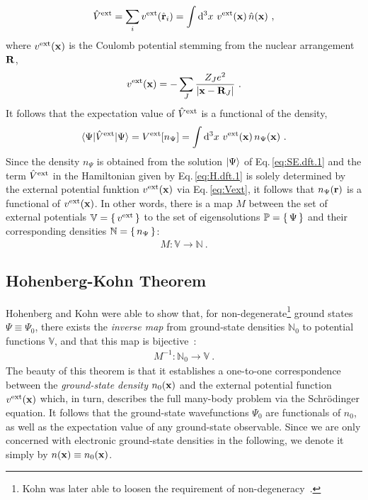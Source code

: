 \begin{align}
	\hat V^{\rm ext}
		= \sum_i v^{\rm ext} (\hat{\bf r}_i)
		= \int \d^3 x ~ v^{\rm ext} ({\bf x}) \, \hat n ({\bf x})~,
		\label{eq:Vext}
\end{align}
where $v^{\rm ext} ({\bf x})$ is the Coulomb potential stemming from the nuclear arrangement $\bf R$,
\begin{align}
	v^{\rm ext} ({\bf x})
		= -\sum_{J} \frac{Z_J e^{2}}{\left|\b x - {\bf R}_{J}\right|}~.
	\label{eq:dft.v^ext}
\end{align}
It follows that the expectation value of $\hat V^{\rm ext}$ is a functional of the density,
\begin{align}
	\braket{\Psi | \hat V^{\rm ext} | \Psi}
		= V^{\rm ext} [n_\Psi]
		= \int \d^3 x ~ v^{\rm ext} ({\bf x}) \, n_\Psi ({\bf x})~.
		\label{eq:dft.Vext.expectation}
\end{align}
Since the density $n_\Psi$ is obtained from the solution $\Ket{\Psi}$ of Eq.\,\eqref{eq:SE.dft.1} and the term $\hat V^{\rm ext}$ in the Hamiltonian given by Eq.\,\eqref{eq:H.dft.1} is solely determined by the external potential funktion $v^{\rm ext} ({\bf x})$ via Eq.\,\eqref{eq:Vext}, it follows that $n_\Psi ({\bf r})$ is a functional of $v^{\rm ext} ({\bf x})$. In other words, there is a map $M$ between the set of external potentials $\mathbb V = \set{v^{\rm ext}}$ to the set of eigensolutions $\mathbb P = \set{\Psi}$ and their corresponding densities $\mathbb N = \set{n_\Psi}$:
\begin{align}
	M: \mathbb V \rightarrow \mathbb N~.
	\label{eq:dft.map.1}
\end{align}

\subsection{Hohenberg-Kohn Theorem}
Hohenberg and Kohn were able to show that, for non-degenerate\footnote{Kohn was later able to loosen the requirement of non-degeneracy~\cite{Kohn1985}.} ground states $\Psi \equiv \Psi_0$, there exists the \emph{inverse map} from ground-state densities $\mathbb N_0$ to potential functions $\mathbb V$, and that this map is bijective~\cite{Hohenberg1964}:
\begin{align}
	M^{-1}: \mathbb N_0 \rightarrow \mathbb V~. 
\end{align}
The beauty of this theorem is that it establishes a one-to-one correspondence between the \emph{ground-state density} $n_0 ({\bf x})$ and the external potential function $v^{\rm ext} ({\bf x})$ which, in turn, describes the full many-body problem via the Schr\"odinger equation. It follows that the ground-state wavefunctions $\Psi_0$ are functionals of $n_0$, as well as the expectation value of any ground-state observable. Since we are only concerned with electronic ground-state densities in the following, we denote it simply by $n ({\bf x}) \equiv n_0 ({\bf x})$.

